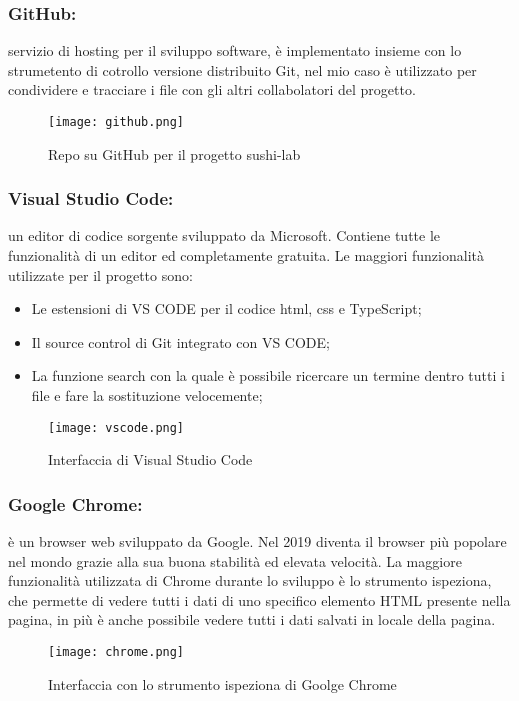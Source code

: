 \subsubsection{GitHub:}
servizio di hosting per il sviluppo software, è implementato insieme con lo strumetento di cotrollo versione distribuito Git, nel mio caso è utilizzato per condividere e tracciare i file con gli altri collabolatori del progetto.
\begin{figure}[H]
    \centering
    \texttt{[image: github.png]}
    \caption{Repo su GitHub per il progetto sushi-lab}
\end{figure}
\subsubsection{Visual Studio Code:}
un editor di codice sorgente sviluppato da Microsoft. Contiene tutte le funzionalità di un editor ed completamente gratuita. Le maggiori funzionalità utilizzate per il progetto sono:
\begin{itemize}
    \item Le estensioni di VS CODE per il codice html, css e TypeScript;
    \item Il source control di Git integrato con VS CODE;
    \item La funzione search con la quale è possibile ricercare un termine dentro tutti i file e fare la sostituzione velocemente;
\end{itemize}
\begin{figure}[H]
    \centering
    \texttt{[image: vscode.png]}
    \caption{Interfaccia di Visual Studio Code}
\end{figure}
\subsubsection{Google Chrome:}
è un browser web sviluppato da Google. Nel 2019 diventa il browser più popolare nel mondo grazie alla sua buona stabilità ed elevata velocità. La maggiore funzionalità  utilizzata di Chrome durante lo sviluppo è  lo strumento ispeziona, che permette di vedere tutti i dati di uno specifico elemento HTML presente nella pagina, in più è anche possibile vedere tutti i dati salvati in locale della pagina.
\begin{figure}[H]
    \centering
    \texttt{[image: chrome.png]}
    \caption{Interfaccia con lo strumento ispeziona di Goolge Chrome}
\end{figure}
    
